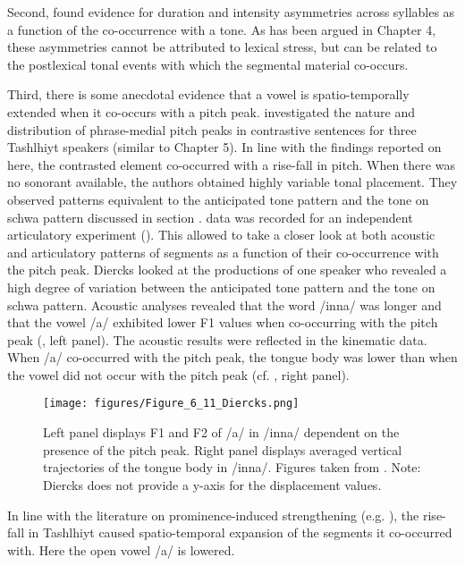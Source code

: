 Second, \citet{GordonNafi2012} found evidence for duration and intensity asymmetries across syllables as a function of the co-occurrence with a tone. As has been argued in Chapter 4, these asymmetries cannot be attributed to lexical stress, but can be related to the postlexical tonal events with which the segmental material co-occurs. 

Third, there is some anecdotal evidence that a vowel is spatio-temporally extended when it co-occurs with a pitch peak. \citet{Grice.etal2011} investigated the nature and distribution of phrase-medial pitch peaks in contrastive sentences for three Tashlhiyt speakers (similar to Chapter 5). In line with the findings reported on here, the contrasted element co-occurred with a rise-fall in pitch. When there was no sonorant available, the authors obtained highly variable tonal placement. They observed patterns equivalent to the anticipated tone pattern and the tone on schwa pattern discussed in section .  data was recorded for an independent articulatory experiment (\citealt{Hermes.etal2011}). This allowed \citet{Diercks2011} to take a closer look at both acoustic and articulatory patterns of segments as a function of their co-occurrence with the pitch peak. Diercks looked at the productions of one speaker who revealed a high degree of variation between the anticipated tone pattern and the tone on schwa pattern. Acoustic analyses revealed that the word /inna/ was longer and that the vowel /a/ exhibited lower F1 values when co-occurring with the pitch peak (, left panel). The acoustic results were reflected in the kinematic data. When /a/ co-occurred with the pitch peak, the tongue body was lower than when the vowel did not occur with the pitch peak (cf. , right panel).

  \begin{figure}
   
   \texttt{[image: figures/Figure\_6\_11\_Diercks.png]}
  \caption{Left panel displays F1 and F2 of /a/ in /inna/ dependent on the presence of the pitch peak. Right panel displays averaged vertical trajectories of the tongue body in /inna/. Figures taken from \citet{Diercks2011}. Note: Diercks does not provide a y-axis for the displacement values.}
   \label{fig:6.11}
   \end{figure}

    \largerpage
In line with the literature on prominence-induced strengthening (e.g. \citealt{Harrington.etal2000,ChoKeating2009,MueckeGrice2014}), the rise-fall in Tashlhiyt caused spatio-temporal expansion of the segments it co-occurred with. Here the open vowel /a/ is lowered.

